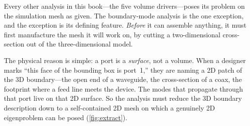 Every other analysis in this book---the five volume drivers---poses its problem on
the simulation mesh as given. The boundary-mode analysis is the one exception, and
the exception is its defining feature. \emph{Before} it can assemble anything, it
must first manufacture the mesh it will work on, by cutting a two-dimensional
cross-section out of the three-dimensional model.

The physical reason is simple: a port is a \emph{surface}, not a volume. When a
designer marks ``this face of the bounding box is port~1,'' they are naming a 2D
patch of the 3D boundary---the open end of a waveguide, the cross-section of a
coax, the footprint where a feed line meets the device. The modes that propagate
through that port live on that 2D surface. So the analysis must reduce the 3D
boundary description down to a self-contained 2D mesh on which a genuinely 2D
eigenproblem can be posed (\cref{fig:extract}).

